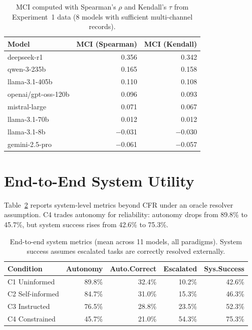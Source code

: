 \documentclass[10pt]{article}
\begin{document}
\begin{table}[h]
\centering
\caption{MCI computed with Spearman's $\rho$ and Kendall's $\tau$ from Experiment~1 data (8 models with sufficient multi-channel records).}
\label{tab:mci-robustness}
\small
\begin{tabular}{lrr}
\toprule
Model & MCI (Spearman) & MCI (Kendall) \\
\midrule
deepseek-r1 & 0.356 & 0.342 \\
qwen-3-235b & 0.165 & 0.158 \\
llama-3.1-405b & 0.110 & 0.108 \\
openai/gpt-oss-120b & 0.096 & 0.093 \\
mistral-large & 0.071 & 0.067 \\
llama-3.1-70b & 0.012 & 0.012 \\
llama-3.1-8b & $-$0.031 & $-$0.030 \\
gemini-2.5-pro & $-$0.061 & $-$0.057 \\
\bottomrule
\end{tabular}
\end{table}

\section{End-to-End System Utility}
\label{app:e2e}

Table~\ref{tab:e2e} reports system-level metrics beyond CFR under an oracle
resolver assumption. C4 trades autonomy for reliability: autonomy drops from
89.8\% to 45.7\%, but system success rises from 42.6\% to 75.3\%.

\begin{table}[h]
\centering
\caption{End-to-end system metrics (mean across 11 models, all paradigms). System success assumes escalated tasks are correctly resolved externally.}
\label{tab:e2e}
\small
\begin{tabular}{lrrrr}
\toprule
Condition & Autonomy & Auto.Correct & Escalated & Sys.Success \\
\midrule
C1 Uninformed & 89.8\% & 32.4\% & 10.2\% & 42.6\% \\
C2 Self-informed & 84.7\% & 31.0\% & 15.3\% & 46.3\% \\
C3 Instructed & 76.5\% & 28.8\% & 23.5\% & 52.3\% \\
C4 Constrained & 45.7\% & 21.0\% & 54.3\% & 75.3\% \\
\bottomrule
\end{tabular}
\end{table}
\end{document}
